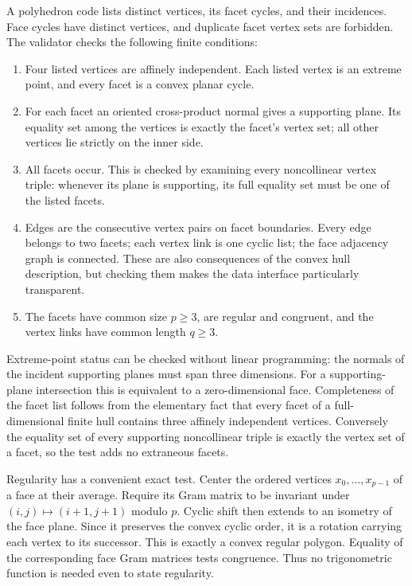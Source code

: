 A polyhedron code lists distinct vertices, its facet cycles, and their
incidences. Face cycles have distinct vertices, and duplicate facet
vertex sets are forbidden. The validator checks the following finite conditions:
\begin{enumerate}
\item Four listed vertices are affinely independent. Each listed vertex
is an extreme point, and every facet is a convex planar cycle.
\item For each facet an oriented cross-product normal gives a supporting
plane. Its equality set among the vertices is exactly the facet's vertex
set; all other vertices lie strictly on the inner side.
\item All facets occur. This is checked by examining every noncollinear
vertex triple: whenever its plane is supporting, its full equality set
must be one of the listed facets.
\item Edges are the consecutive vertex pairs on facet boundaries.
Every edge belongs to two facets; each vertex link is one cyclic list;
the face adjacency graph is connected. These are also consequences of
the convex hull description, but checking them makes the data interface
particularly transparent.
\item The facets have common size $p\geq3$, are regular and congruent,
and the vertex links have common length $q\geq3$.
\end{enumerate}
Extreme-point status can be checked without linear programming: the
normals of the incident supporting planes must span three dimensions.
For a supporting-plane intersection this is equivalent to a zero-dimensional
face. Completeness of the facet list follows from the elementary fact
that every facet of a full-dimensional finite hull contains three
affinely independent vertices. Conversely the equality set of every
supporting noncollinear triple is exactly the vertex set of a facet,
so the test adds no extraneous facets.

Regularity has a convenient exact test. Center the ordered vertices
$x_0,\ldots,x_{p-1}$ of a face at their average. Require its Gram matrix
to be invariant under $(i,j)\mapsto(i+1,j+1)$ modulo $p$. Cyclic shift
then extends to an isometry of the face plane. Since it preserves the
convex cyclic order, it is a rotation carrying each vertex to its
successor. This is exactly a convex regular polygon. Equality of the
corresponding face Gram matrices tests congruence. Thus no trigonometric
function is needed even to state regularity.

